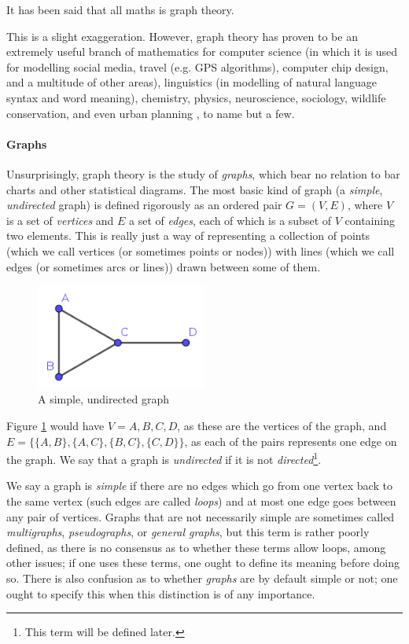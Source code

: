 
	It has been said that all maths is graph theory.
	
	This is a slight exaggeration. However, graph theory has proven to be an extremely useful branch of mathematics for computer science (in which it is used for modelling social media, travel (e.g. GPS algorithms), computer chip design, and a multitude of other areas), linguistics (in modelling of natural language syntax and word meaning), chemistry, physics, neuroscience, sociology, wildlife conservation, and even urban planning \cite{acityisnotatree}, to name but a few.

	\paragraph{Graphs}
	
	Unsurprisingly, graph theory is the study of \textit{graphs}, which bear no relation to bar charts and other statistical diagrams. The most basic kind of graph (a \textit{simple}, \textit{undirected} graph) is defined rigorously as an ordered pair \(G=(V,E)\), where \(V\) is a set of \textit{vertices} and \(E\) a set of \textit{edges}, each of which is a subset of \(V\) containing two elements. This is really just a way of representing a collection of points (which we call vertices (or sometimes points or nodes)) with lines (which we call edges (or sometimes arcs or lines)) drawn between some of them.
	
	\begin{figure}[h]
		\centering
		\includegraphics[width=0.5\textwidth]{simplegraph}
		\caption{A simple, undirected graph}
		\label{simplegraph}
	\end{figure}
	
	Figure \ref{simplegraph} would have \(V={A,B,C,D}\), as these are the vertices of the graph, and \(E=\{\{A,B\},\{A,C\},\{B,C\},\{C,D\}\}\), as each of the pairs represents one edge on the graph. We say that a graph is \textit{undirected} if it is not \textit{directed}\footnote{This term will be defined later.\label{definedlater}}.
	
	We say a graph is \textit{simple} if there are no edges which go from one vertex back to the same vertex (such edges are called \textit{loops}) and at most one edge goes between any pair of vertices. Graphs that are not necessarily simple are sometimes called \textit{multigraphs}, \textit{pseudographs}, or \textit{general graphs}, but this term is rather poorly defined, as there is no consensus as to whether these terms allow loops, among other issues; if one uses these terms, one ought to define its meaning before doing so. There is also confusion as to whether \textit{graphs} are by default simple or not; one ought to specify this when this distinction is of any importance.
	
